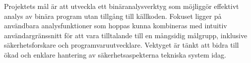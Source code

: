 Projektets mål är att utveckla ett binäranalysverktyg som möjliggör effektivt
analys av binära program utan tillgång till källkoden. Fokuset ligger på
användbara analysfunktioner som hoppas kunna kombineras med intuitiv
användargränssnitt för att vara tilltalande till en mångsidig målgrupp,
inklusive säkerhetsforskare och programvaruutvecklare. Vektyget är tänkt att
bidra till ökad och enklare hantering av säkerhetsaspekterna tekniska system idag.
